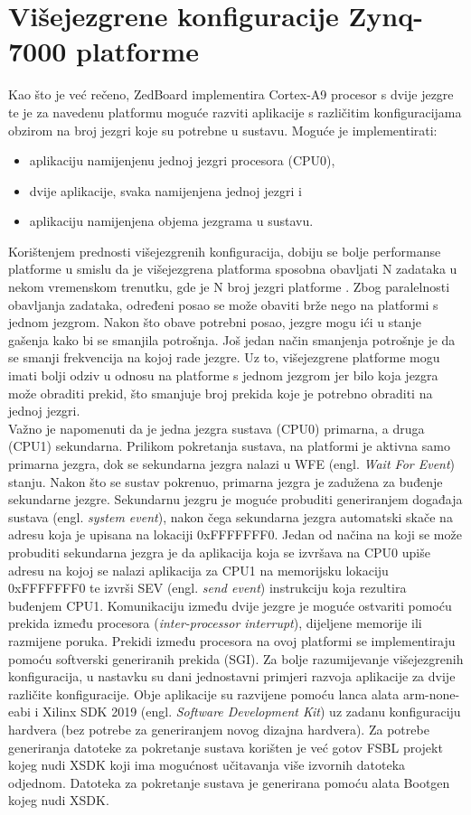 \documentclass[times, utf8, diplomski, numeric]{fer}
\begin{document}
\chapter{Višejezgrene konfiguracije Zynq-7000 platforme}
Kao što je već rečeno, ZedBoard implementira Cortex-A9 procesor s dvije jezgre te je za navedenu
platformu moguće razviti aplikacije s različitim konfiguracijama obzirom na broj jezgri koje su potrebne
u sustavu. Moguće je implementirati:
\begin{itemize}
  \item{aplikaciju namijenjenu jednoj jezgri procesora (CPU0),}
  \item{dvije aplikacije, svaka namijenjena jednoj jezgri i}
  \item{aplikaciju namijenjena objema jezgrama u sustavu.}
\end{itemize}
Korištenjem prednosti višejezgrenih konfiguracija, dobiju se bolje performanse platforme u smislu da je višejezgrena platforma
sposobna obavljati N zadataka u nekom vremenskom trenutku, gde je N broj jezgri platforme \cite{cortexa_pg}. Zbog paralelnosti
obavljanja zadataka, određeni posao se može obaviti brže nego na platformi s jednom jezgrom. Nakon što obave potrebni posao,
jezgre mogu ići u stanje gašenja kako bi se smanjila potrošnja. Još jedan način smanjenja potrošnje je da se smanji frekvencija
na kojoj rade jezgre. Uz to, višejezgrene platforme mogu imati bolji odziv u odnosu na platforme s jednom jezgrom jer bilo koja
jezgra može obraditi prekid, što smanjuje broj prekida koje je potrebno obraditi na jednoj jezgri.\\
Važno je napomenuti da je jedna jezgra sustava (CPU0) primarna, a druga (CPU1) sekundarna. Prilikom
pokretanja sustava, na platformi je aktivna samo primarna jezgra, dok se sekundarna jezgra nalazi u
WFE (engl. \textit{Wait For Event}) stanju. Nakon što se sustav pokrenuo, primarna jezgra je zadužena
za buđenje sekundarne jezgre. Sekundarnu jezgru je moguće probuditi generiranjem događaja sustava
(engl. \textit{system event}), nakon čega sekundarna jezgra automatski skače na adresu koja je upisana
na lokaciji 0xFFFFFFF0. Jedan od načina na koji se može probuditi sekundarna jezgra je da aplikacija
koja se izvršava na CPU0 upiše adresu na kojoj se nalazi aplikacija za CPU1 na memorijsku lokaciju
0xFFFFFFF0 te izvrši SEV (engl. \textit{send event}) instrukciju koja rezultira buđenjem CPU1.
Komunikaciju između dvije jezgre je moguće ostvariti pomoću prekida između procesora
(\textit{inter-processor interrupt}), dijeljene memorije ili razmijene poruka. Prekidi između procesora
na ovoj platformi se implementiraju pomoću softverski generiranih prekida (SGI). Za bolje razumijevanje
višejezgrenih konfiguracija, u nastavku su dani jednostavni primjeri razvoja aplikacije za dvije različite
konfiguracije. Obje aplikacije su razvijene pomoću lanca alata arm-none-eabi i Xilinx SDK 2019 (engl.
\textit{Software Development Kit}) uz zadanu konfiguraciju hardvera (bez potrebe za generiranjem
novog dizajna hardvera). Za potrebe generiranja datoteke za pokretanje sustava korišten je već gotov FSBL projekt
kojeg nudi XSDK koji ima mogućnost učitavanja više izvornih datoteka odjednom. Datoteka za pokretanje sustava je
generirana pomoću alata Bootgen kojeg nudi XSDK.
\end{document}
